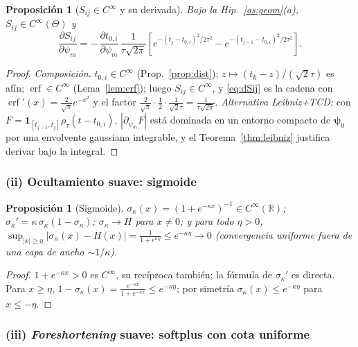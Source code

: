 \documentclass[11pt,a4paper]{article}
\theoremstyle{plain}
\newtheorem{proposition}[theorem]{Proposici\'on}
\theoremstyle{definition}
\newcommand{\vect}[1]{\boldsymbol{#1}}
\newcommand{\R}{\mathbb{R}}
\newcommand{\erf}{\operatorname{erf}}
\newcommand{\abs}[1]{\left\lvert #1 \right\rvert}
\begin{document}
\begin{proposition}[$S_{ij}\in C^\infty$ y su derivada]\label{prop:Sij}
Bajo la Hip.~\ref{as:geom}(a), $S_{ij}\in C^\infty(\Theta)$ y
\begin{equation}
    \frac{\partial S_{ij}}{\partial\psi_m}
    =-\,\frac{\partial t_{0,i}}{\partial\psi_m}\,
    \frac{1}{\tau\sqrt{2\pi}}
    \left[
        e^{-(t_j-t_{0,i})^2/2\tau^2}
        - e^{-(t_{j-1}-t_{0,i})^2/2\tau^2}
    \right].
    \label{eq:dSij}
\end{equation}
\end{proposition}
\begin{proof}
\emph{Composici\'on.} $t_{0,i}\in C^\infty$ (Prop.~\ref{prop:dist});
$z\mapsto(t_k-z)/(\sqrt2\tau)$ es af\'in; $\erf\in C^\infty$
(Lema~\ref{lem:erf}); luego $S_{ij}\in C^\infty$, y \eqref{eq:dSij} es la cadena
con $\erf'(x)=\frac{2}{\sqrt\pi}e^{-x^2}$ y el factor
$\frac{2}{\sqrt\pi}\cdot\frac12\cdot\frac{1}{\sqrt2\tau}=\frac{1}{\tau\sqrt{2\pi}}$.
\emph{Alternativa Leibniz+TCD:} con $F=\mathbf 1_{[t_{j-1},t_j]}\rho_\tau(t-t_{0,i})$,
$\abs{\partial_{\psi_m}F}$ est\'a dominada en un entorno compacto de
$\vect{\psi}_0$ por una envolvente gaussiana integrable, y el
Teorema~\ref{thm:leibniz} justifica derivar bajo la integral.
\end{proof}

\subsubsection*{(ii) Ocultamiento suave: sigmoide}

\begin{proposition}[Sigmoide]\label{prop:sigmoid}
$\sigma_\kappa(x)=(1+e^{-\kappa x})^{-1}\in C^\infty(\R)$;
$\sigma_\kappa'=\kappa\,\sigma_\kappa(1-\sigma_\kappa)$;
$\sigma_\kappa\to H$ para $x\neq0$; y para todo $\eta>0$,
$\sup_{\abs{x}\ge\eta}\abs{\sigma_\kappa(x)-H(x)}=\frac{1}{1+e^{\kappa\eta}}\le
e^{-\kappa\eta}\to0$ (convergencia uniforme fuera de una capa de ancho
$\sim1/\kappa$).
\end{proposition}
\begin{proof}
$1+e^{-\kappa x}>0$ es $C^\infty$, su rec\'iproca tambi\'en; la f\'ormula de
$\sigma_\kappa'$ es directa. Para $x\ge\eta$,
$1-\sigma_\kappa(x)=\frac{e^{-\kappa x}}{1+e^{-\kappa x}}\le e^{-\kappa\eta}$; por
simetr\'ia $\sigma_\kappa(x)\le e^{-\kappa\eta}$ para $x\le-\eta$.
\end{proof}

\subsubsection*{(iii) \emph{Foreshortening} suave: softplus con cota uniforme}
\end{document}
